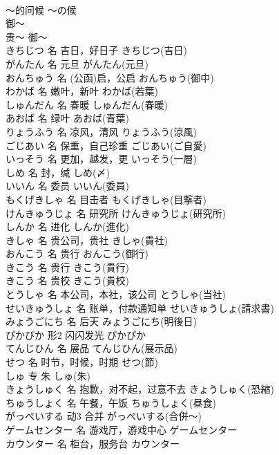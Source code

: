 \documentclass[8pt]{extreport}
\begin{document}
\begin{CJK}{UTF8}{min}
\\	～的问候	～の候	
\\	御～	
\\	贵～	御～	
\\	きちじつ	名	吉日，好日子	きちじつ(吉日)	
\\	がんたん	名	元旦	がんたん(元旦)	
\\	おんちゅう	名	(公函)启，公启	おんちゅう(御中)	
\\	わかば	名	嫩叶，新叶	わかば(若葉)	
\\	しゅんだん	名	春暖	しゅんだん(春暖)	
\\	あおば	名	绿叶	あおば(青葉)	
\\	りょうふう	名	凉风，清风	りょうふう(涼風)	
\\	ごじあい	名	保重，自己珍重	ごじあい(ご自愛)	
\\	いっそう	名	更加，越发，更	いっそう(一層)	
\\	しめ	名	封，缄	しめ(〆)	
\\	いいん	名	委员	いいん(委員)	
\\	もくげきしゃ	名	目击者	もくげきしゃ(目撃者)	
\\	けんきゅうじょ	名	研究所	けんきゅうじょ(研究所)	
\\	しんか	名	进化	しんか(進化)	
\\	きしゃ	名	贵公司，贵社	きしゃ(貴社)	
\\	おんこう	名	贵行	おんこう(御行)	
\\	きこう	名	贵行	きこう(貴行)	
\\	きこう	名	贵校	きこう(貴校)	
\\	とうしゃ	名	本公司，本社，该公司	とうしゃ(当社)	
\\	せいきゅうしょ	名	账单，付款通知单	せいきゅうしょ(請求書)	
\\	みょうごにち	名	后天	みょうごにち(明後日)	
\\	ぴかぴか	形2	闪闪发光	ぴかぴか	
\\	てんじひん	名	展品	てんじひん(展示品)	
\\	せつ	名	时节，时候，时期	せつ(節)	
\\	しゅ	专	朱	しゅ(朱)	
\\	きょうしゅく	名	抱歉，对不起，过意不去	きょうしゅく(恐縮)	
\\	ちゅうしょく	名	午餐，午饭	ちゅうしょく(昼食)	
\\	がっぺいする	动3	合并	がっぺいする(合併～)	
\\	ゲームセンター	名	游戏厅，游戏中心	ゲームセンター	
\\	カウンター	名	柜台，服务台	カウンター	

\end{CJK}
\end{document}
